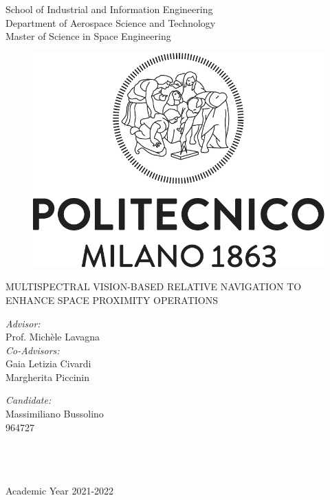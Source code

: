 
\begin{titlepage}
\mbox{}
\vspace{1cm}
\begin{center}
    {\Large School of Industrial and Information Engineering}\\
    {\Large Department of Aerospace Science and Technology}\\
    \vspace{0.3cm}
    {\Large Master of Science in Space Engineering}
\end{center}
\vspace{1cm}
\begin{figure}[H]
    \centering
    \includegraphics[width = 0.6\linewidth]{Images/polimilogovector.pdf}
\end{figure}
\vspace{1cm}

\begin{center}
\LARGE
\textsc{ MULTISPECTRAL VISION-BASED RELATIVE NAVIGATION TO ENHANCE SPACE
PROXIMITY OPERATIONS}
\par
\end{center}
\vspace{1.5cm}
\begin{minipage}{0.5\linewidth}
\textit{Advisor:}\\
Prof. Michèle Lavagna\\
\textit{Co-Advisors:}\\
Gaia Letizia Civardi\\
Margherita Piccinin\\
\end{minipage}
\begin{minipage}{0.5\linewidth}
\begin{flushright}
\textit{Candidate:}\\
Massimiliano Bussolino\\
964727\\
\mbox{}\\
\mbox{}\\
\mbox{}\\
\end{flushright}
\end{minipage}
\begin{center}
    Academic Year 2021-2022
\end{center}
\end{titlepage}
\restoregeometry